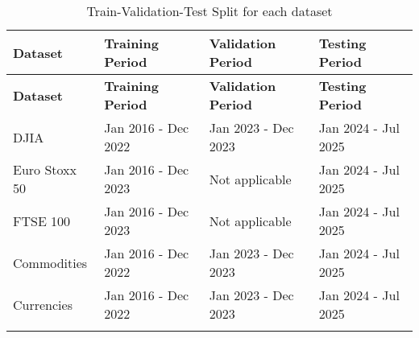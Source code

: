 \begin{longtable}{|l|l|l|l|}
    \hline
    \textbf{Dataset} & \textbf{Training Period} & \textbf{Validation Period} & \textbf{Testing Period} \\ \midrule
    \endfirsthead

    \hline
    \textbf{Dataset} & \textbf{Training Period} & \textbf{Validation Period} & \textbf{Testing Period} \\ \midrule
    \endhead

    \endfoot
    \hline
    DJIA & Jan 2016 - Dec 2022 & Jan 2023 - Dec 2023 & Jan 2024 - Jul 2025 \\
    \hline
    Euro Stoxx 50 & Jan 2016 - Dec 2023 & Not applicable & Jan 2024 - Jul 2025 \\
    \hline
    FTSE 100 & Jan 2016 - Dec 2023 & Not applicable & Jan 2024 - Jul 2025 \\
    \hline
    Commodities & Jan 2016 - Dec 2022 & Jan 2023 - Dec 2023 & Jan 2024 - Jul 2025 \\
    \hline
    Currencies & Jan 2016 - Dec 2022 & Jan 2023 - Dec 2023 & Jan 2024 - Jul 2025 \\
    \hline
    \caption{Train-Validation-Test Split for each dataset}
    \label{tab:dataset-split}
\end{longtable}